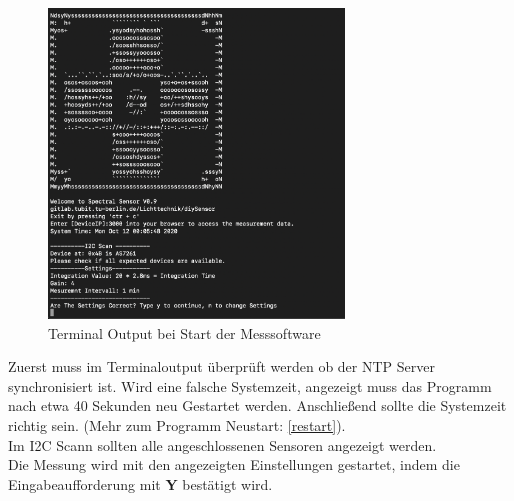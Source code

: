 \begin{figure}[H]
\centering
\includegraphics[width=0.7\textwidth]{img/handbuch/check_settings}
\caption{Terminal Output bei Start der Messsoftware }
\label{fig:Start-der-Messsoftware}
\end{figure}
\noindent Zuerst muss im Terminaloutput überprüft werden ob der NTP Server synchronisiert ist.
Wird eine falsche Systemzeit, angezeigt muss das Programm nach etwa 40 Sekunden neu Gestartet werden. Anschließend sollte die Systemzeit richtig sein. (Mehr zum Programm Neustart: \ref{restart}).\\
Im I2C Scann sollten alle angeschlossenen Sensoren angezeigt werden.\\
Die Messung wird mit den angezeigten Einstellungen gestartet, indem die Eingabeaufforderung mit \textbf{Y} bestätigt wird.\\

